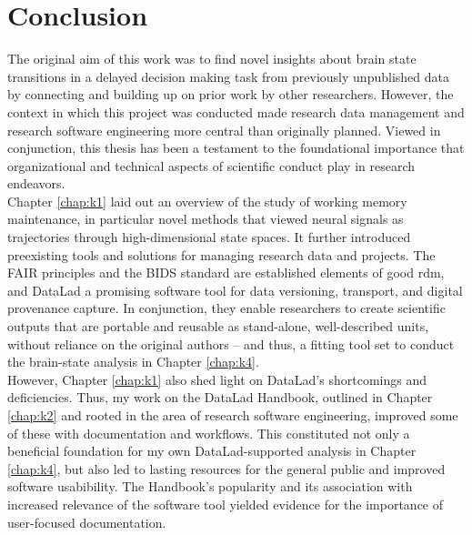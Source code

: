 

\chapter{Conclusion}
\label{discussion}

The original aim of this work was to find novel insights about brain state transitions in a delayed decision making task from previously unpublished data by connecting and building up on prior work by other researchers.
However, the context in which this project was conducted made research data management and research software engineering more central than originally planned.
Viewed in conjunction, this thesis has been a testament to the foundational importance that organizational and technical aspects of scientific conduct play in research endeavors.\\
Chapter \ref{chap:k1} laid out an overview of the study of working memory maintenance, in particular novel methods that viewed neural signals as trajectories through high-dimensional state spaces.
It further introduced preexisting tools and solutions for managing research data and projects.
The \gls{FAIR} principles and the \gls{BIDS} standard are established elements of good \gls{rdm}, and DataLad a promising software tool for data versioning, transport, and digital provenance capture.
In conjunction, they enable researchers to create scientific outputs that are portable and reusable as stand-alone, well-described units, without reliance on the original authors -- and thus, a fitting tool set to conduct the brain-state analysis in Chapter \ref{chap:k4}.\\
However, Chapter \ref{chap:k1} also shed light on DataLad's shortcomings and deficiencies.
Thus, my work on the DataLad Handbook, outlined in Chapter \ref{chap:k2} and rooted in the area of research software engineering, improved some of these with documentation and workflows.
This constituted not only a beneficial foundation for my own DataLad-supported analysis in Chapter \ref{chap:k4}, but also led to lasting resources for the general public and improved software usabibility.
The Handbook's popularity and its association with increased relevance of the software tool yielded evidence for the importance of user-focused documentation.
